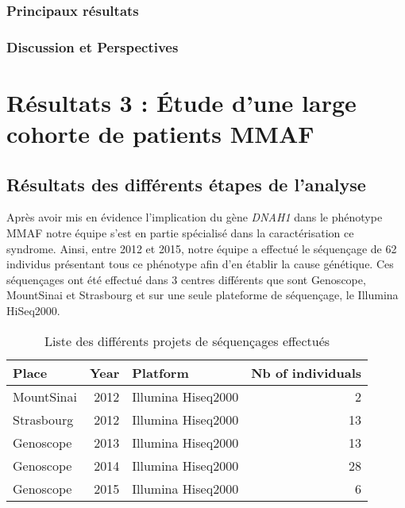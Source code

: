 \documentclass[12pt,twoside]{reedthesis}
\theoremstyle{definition}
\theoremstyle{definition}
\theoremstyle{remark}
\begin{document}
  \newpage
  
  
  
  \newpage
  
  \subsubsection{Principaux résultats}\label{principaux-resultats-3}
  
  \subsubsection{Discussion et
  Perspectives}\label{discussion-et-perspectives}
  
  \newpage  
  
  \section{Résultats 3 : Étude d'une large cohorte de patients
  MMAF}\label{resultats-3-etude-dune-large-cohorte-de-patients-mmaf}
  
  \subsection{Résultats des différents étapes de
  l'analyse}\label{resultats-des-differents-etapes-de-lanalyse-1}
  
  Après avoir mis en évidence l'implication du gène \emph{DNAH1} dans le
  phénotype MMAF notre équipe s'est en partie spécialisé dans la
  caractérisation ce syndrome. Ainsi, entre 2012 et 2015, notre équipe a
  effectué le séquençage de 62 individus présentant tous ce phénotype afin
  d'en établir la cause génétique. Ces séquençages ont été effectué dans 3
  centres différents que sont Genoscope, MountSinai et Strasbourg et sur
  une seule plateforme de séquençage, le Illumina HiSeq2000.
  
  \begin{longtable}[t]{lrlr}
  \caption{\label{tab:tabrunbigmmaf}Liste des différents projets de séquençages effectués}\\
  \toprule
  Place & Year & Platform & Nb of individuals\\
  \midrule
  MountSinai & 2012 & Illumina Hiseq2000 & 2\\
  Strasbourg & 2012 & Illumina Hiseq2000 & 13\\
  Genoscope & 2013 & Illumina Hiseq2000 & 13\\
  Genoscope & 2014 & Illumina Hiseq2000 & 28\\
  Genoscope & 2015 & Illumina Hiseq2000 & 6\\
  \bottomrule
  \end{longtable}
  
\end{document}
